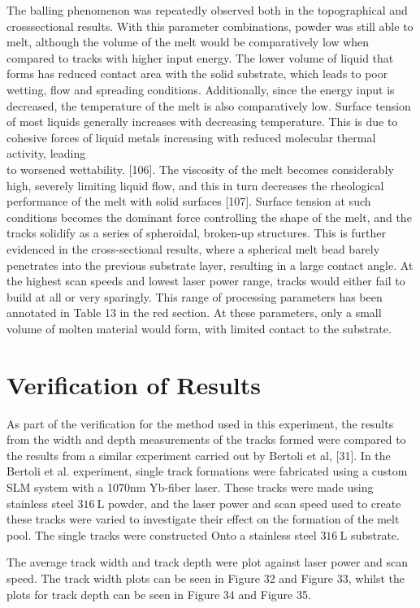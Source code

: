 \documentclass[10pt]{article}
\begin{document}
The balling phenomenon was repeatedly observed both in the topographical and crosssectional results. With this parameter combinations, powder was still able to melt, although the volume of the melt would be comparatively low when compared to tracks with higher input energy. The lower volume of liquid that forms has reduced contact area with the solid substrate, which leads to poor wetting, flow and spreading conditions. Additionally, since the energy input is decreased, the temperature of the melt is also comparatively low. Surface tension of most liquids generally increases with decreasing temperature. This is due to cohesive forces of liquid metals increasing with reduced molecular thermal activity, leading\\
to worsened wettability. [106]. The viscosity of the melt becomes considerably high, severely limiting liquid flow, and this in turn decreases the rheological performance of the melt with solid surfaces [107]. Surface tension at such conditions becomes the dominant force controlling the shape of the melt, and the tracks solidify as a series of spheroidal, broken-up structures. This is further evidenced in the cross-sectional results, where a spherical melt bead barely penetrates into the previous substrate layer, resulting in a large contact angle. At the highest scan speeds and lowest laser power range, tracks would either fail to build at all or very sparingly. This range of processing parameters has been annotated in Table 13 in the red section. At these parameters, only a small volume of molten material would form, with limited contact to the substrate.

\section*{Verification of Results}
As part of the verification for the method used in this experiment, the results from the width and depth measurements of the tracks formed were compared to the results from a similar experiment carried out by Bertoli et al, [31]. In the Bertoli et al. experiment, single track formations were fabricated using a custom SLM system with a 1070nm Yb-fiber laser. These tracks were made using stainless steel $316 \mathrm{~L}$ powder, and the laser power and scan speed used to create these tracks were varied to investigate their effect on the formation of the melt pool. The single tracks were constructed Onto a stainless steel $316 \mathrm{~L}$ substrate.

The average track width and track depth were plot against laser power and scan speed. The track width plots can be seen in Figure 32 and Figure 33, whilst the plots for track depth can be seen in Figure 34 and Figure 35.
\end{document}
